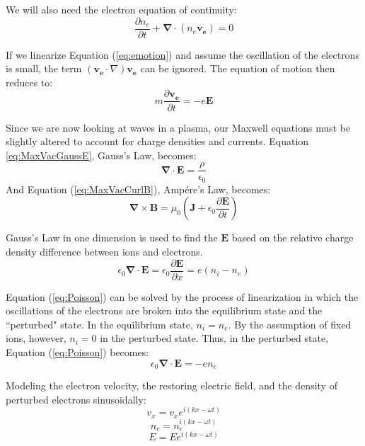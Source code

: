 \documentclass[twocolumn]{article}
\begin{document}
We will also need the electron equation of continuity:
\begin{equation}
	\frac{\partial n_e}{\partial t} + \mathbf{\nabla} \cdot (n_e \mathbf{v_e}) = 0
	\label{eq:ElectronContinuity}
\end{equation}

If we linearize Equation (\ref{eq:emotion}) and assume the oscillation of the electrons is small, the term $\left(\mathbf{v_e} \cdot \nabla \right) \mathbf{v_e}$ can be ignored.
The equation of motion then reduces to:
\begin{equation}
	m \frac{\partial \mathbf{v_e}}{\partial t} = -e \mathbf{E}
	\label{eq:EmotionLinear}
\end{equation}

Since we are now looking at waves in a plasma, our Maxwell equations must be slightly altered to account for charge densities and currents.
Equation \ref{eq:MaxVacGaussE}, Gauss's Law, becomes:
\begin{equation}
	\label{eq:MaxGaussE}
	\mathbf{\nabla} \cdot \mathbf{E} = \frac{\rho}{\epsilon_0}
\end{equation}
And Equation (\ref{eq:MaxVacCurlB}), Amp\'{e}re's Law, becomes:
\begin{equation}
	\label{eq:MaxCurlB}
	\mathbf{\nabla \times B} = \mu_0 \left( \mathbf{J} + \epsilon_0 \frac{\partial \mathbf{E}}{\partial t} \right)
\end{equation}

Gauss's Law in one dimension is used to find the $\mathbf{E}$ based on the relative charge density difference between ions and electrons.
\begin{equation} 
	\epsilon_0 \mathbf{\nabla \cdot E} = \epsilon_0 \frac{\partial\mathbf{E}}{\partial x} = e(n_i - n_e)
	\label{eq:Poisson}
\end{equation}

Equation (\ref{eq:Poisson}) can be solved by the process of linearization in which the oscillations of the electrons are broken into the equilibrium state and the ``perturbed" state.
In the equilibrium state, $n_i = n_e$.
By the assumption of fixed ions, however, $n_i = 0$ in the perturbed state.
Thus, in the perturbed state, Equation (\ref{eq:Poisson}) becomes:
\begin{equation}
	\epsilon_0\mathbf{\nabla \cdot E} = -en_e
	\label{eq:PoissonSimple}
\end{equation}

Modeling the electron velocity, the restoring electric field, and the density of perturbed electrons sinusoidally:
\begin{equation*}
	v_x = v_xe^{i(kx - \omega t)}
\end{equation*}
\begin{equation*}
	n_e = n_e^{i(kx-\omega t)}
\end{equation*}
\begin{equation*}
	E = Ee^{i(kx-\omega t)}
\end{equation*}
\end{document}
